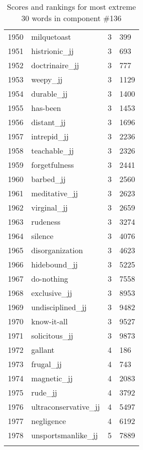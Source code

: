 \begin{longtable}[!htbp]{| rlr@{.}l |}
    1950 & milquetoast & 3 & 399 \\
    1951 & histrionic\_jj & 3 & 693 \\
    1952 & doctrinaire\_jj & 3 & 777 \\
    1953 & weepy\_jj & 3 & 1129 \\
    1954 & durable\_jj & 3 & 1400 \\
    1955 & has-been & 3 & 1453 \\
    1956 & distant\_jj & 3 & 1696 \\
    1957 & intrepid\_jj & 3 & 2236 \\
    1958 & teachable\_jj & 3 & 2326 \\
    1959 & forgetfulness & 3 & 2441 \\
    1960 & barbed\_jj & 3 & 2560 \\
    1961 & meditative\_jj & 3 & 2623 \\
    1962 & virginal\_jj & 3 & 2659 \\
    1963 & rudeness & 3 & 3274 \\
    1964 & silence & 3 & 4076 \\
    1965 & disorganization & 3 & 4623 \\
    1966 & hidebound\_jj & 3 & 5225 \\
    1967 & do-nothing & 3 & 7558 \\
    1968 & exclusive\_jj & 3 & 8953 \\
    1969 & undisciplined\_jj & 3 & 9482 \\
    1970 & know-it-all & 3 & 9527 \\
    1971 & solicitous\_jj & 3 & 9873 \\
    1972 & gallant & 4 & 186 \\
    1973 & frugal\_jj & 4 & 743 \\
    1974 & magnetic\_jj & 4 & 2083 \\
    1975 & rude\_jj & 4 & 3792 \\
    1976 & ultraconservative\_jj & 4 & 5497 \\
    1977 & negligence & 4 & 6192 \\
    1978 & unsportsmanlike\_jj & 5 & 7889 \\
    \hline
    \caption{Scores and rankings for most extreme 30 words in component \#136} \\
\end{longtable}
